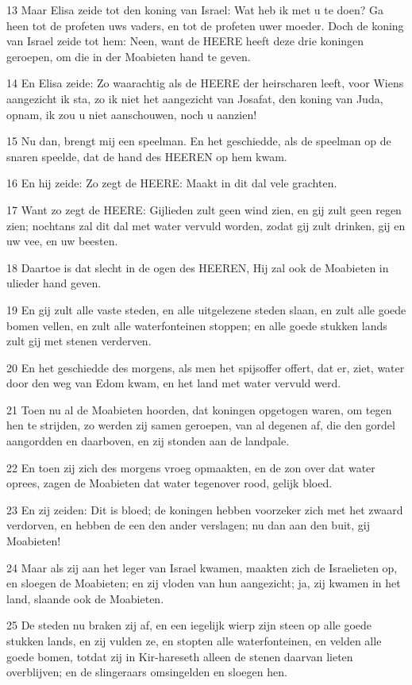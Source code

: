 \par 13 Maar Elisa zeide tot den koning van Israel: Wat heb ik met u te doen? Ga heen tot de profeten uws vaders, en tot de profeten uwer moeder. Doch de koning van Israel zeide tot hem: Neen, want de HEERE heeft deze drie koningen geroepen, om die in der Moabieten hand te geven.
\par 14 En Elisa zeide: Zo waarachtig als de HEERE der heirscharen leeft, voor Wiens aangezicht ik sta, zo ik niet het aangezicht van Josafat, den koning van Juda, opnam, ik zou u niet aanschouwen, noch u aanzien!
\par 15 Nu dan, brengt mij een speelman. En het geschiedde, als de speelman op de snaren speelde, dat de hand des HEEREN op hem kwam.
\par 16 En hij zeide: Zo zegt de HEERE: Maakt in dit dal vele grachten.
\par 17 Want zo zegt de HEERE: Gijlieden zult geen wind zien, en gij zult geen regen zien; nochtans zal dit dal met water vervuld worden, zodat gij zult drinken, gij en uw vee, en uw beesten.
\par 18 Daartoe is dat slecht in de ogen des HEEREN, Hij zal ook de Moabieten in ulieder hand geven.
\par 19 En gij zult alle vaste steden, en alle uitgelezene steden slaan, en zult alle goede bomen vellen, en zult alle waterfonteinen stoppen; en alle goede stukken lands zult gij met stenen verderven.
\par 20 En het geschiedde des morgens, als men het spijsoffer offert, dat er, ziet, water door den weg van Edom kwam, en het land met water vervuld werd.
\par 21 Toen nu al de Moabieten hoorden, dat koningen opgetogen waren, om tegen hen te strijden, zo werden zij samen geroepen, van al degenen af, die den gordel aangordden en daarboven, en zij stonden aan de landpale.
\par 22 En toen zij zich des morgens vroeg opmaakten, en de zon over dat water oprees, zagen de Moabieten dat water tegenover rood, gelijk bloed.
\par 23 En zij zeiden: Dit is bloed; de koningen hebben voorzeker zich met het zwaard verdorven, en hebben de een den ander verslagen; nu dan aan den buit, gij Moabieten!
\par 24 Maar als zij aan het leger van Israel kwamen, maakten zich de Israelieten op, en sloegen de Moabieten; en zij vloden van hun aangezicht; ja, zij kwamen in het land, slaande ook de Moabieten.
\par 25 De steden nu braken zij af, en een iegelijk wierp zijn steen op alle goede stukken lands, en zij vulden ze, en stopten alle waterfonteinen, en velden alle goede bomen, totdat zij in Kir-hareseth alleen de stenen daarvan lieten overblijven; en de slingeraars omsingelden en sloegen hen.
